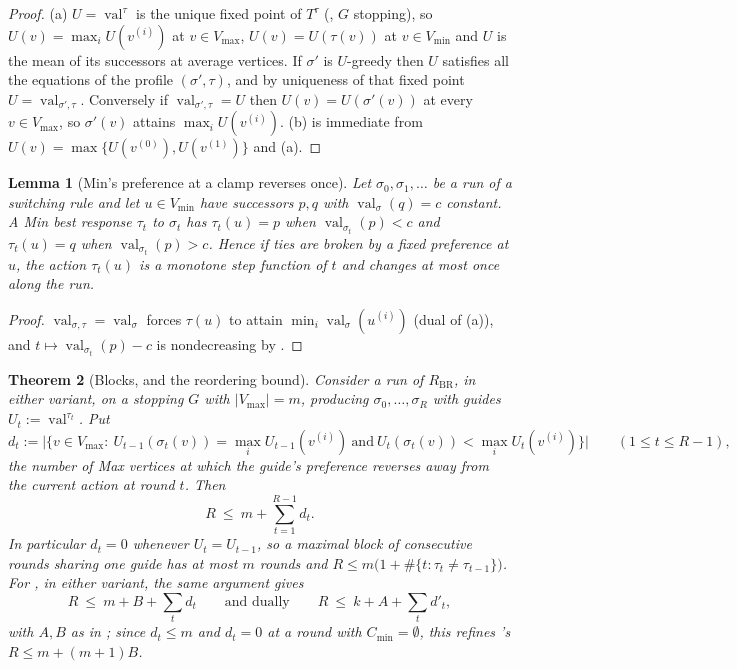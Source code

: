 \documentclass[11pt]{article}
\theoremstyle{plain}
\newtheorem{theorem}{Theorem}[section]
\newtheorem{lemma}[theorem]{Lemma}
\theoremstyle{definition}
\DeclareMathOperator{\val}{val}
\newcommand{\Vmax}{V_{\max}}
\newcommand{\Vmin}{V_{\min}}
\begin{document}
\begin{proof}
(a) $U=\val^{\tau}$ is the unique fixed point of $T^{\tau}$
(, $G$ stopping), so $U(v)=\max_iU(v^{(i)})$ at
$v\in\Vmax$, $U(v)=U(\tau(v))$ at $v\in\Vmin$ and $U$ is the mean of its
successors at average vertices.  If $\sigma'$ is $U$-greedy then $U$ satisfies
all the equations of the profile $(\sigma',\tau)$, and by uniqueness of that
fixed point $U=\val_{\sigma',\tau}$.  Conversely if $\val_{\sigma',\tau}=U$
then $U(v)=U(\sigma'(v))$ at every $v\in\Vmax$, so $\sigma'(v)$ attains
$\max_iU(v^{(i)})$.  (b) is immediate from
$U(v)=\max\{U(v^{(0)}),U(v^{(1)})\}$ and (a).
\end{proof}





\begin{lemma}[Min's preference at a clamp reverses once]\label{lem:clamp-reverses-once}
Let $\sigma_0,\sigma_1,\dots$ be a run of a switching rule and let
$u\in\Vmin$ have successors $p,q$ with $\val_\sigma(q)=c$ constant.  A Min
best response $\tau_t$ to $\sigma_t$ has $\tau_t(u)=p$ when
$\val_{\sigma_t}(p)<c$ and $\tau_t(u)=q$ when $\val_{\sigma_t}(p)>c$.  Hence
if ties are broken by a fixed preference at $u$, the action $\tau_t(u)$ is a
monotone step function of $t$ and changes at most once along the run.
\end{lemma}

\begin{proof}
$\val_{\sigma,\tau}=\val_\sigma$ forces $\tau(u)$ to attain
$\min_i\val_\sigma(u^{(i)})$ (dual of (a)), and
$t\mapsto\val_{\sigma_t}(p)-c$ is nondecreasing by .
\end{proof}

\begin{theorem}[Blocks, and the reordering bound]\label{thm:reorder}
Consider a run of $R_{\mathrm{BR}}$, in either variant, on a stopping $G$ with
$|\Vmax|=m$, producing $\sigma_0,\dots,\sigma_R$ with guides
$U_t:=\val^{\tau_t}$.  Put
\[
  d_t:=\bigl|\{v\in\Vmax:\ U_{t-1}(\sigma_t(v))=\textstyle\max_iU_{t-1}(v^{(i)})
   \ \text{and}\ U_t(\sigma_t(v))<\max_iU_t(v^{(i)})\}\bigr|\qquad(1\le t\le R-1),
\]
the number of Max vertices at which the guide's preference \emph{reverses away
from the current action} at round $t$.  Then
\[
  R\ \le\ m+\sum_{t=1}^{R-1}d_t .
\]
In particular $d_t=0$ whenever $U_t=U_{t-1}$, so a maximal block of
consecutive rounds sharing one guide has at most $m$ rounds and
$R\le m\bigl(1+\#\{t:\tau_t\ne\tau_{t-1}\}\bigr)$.  For , in
either variant, the same argument gives
\[
  R\ \le\ m+B+\sum_{t}d_t\qquad\text{and dually}\qquad R\ \le\ k+A+\sum_{t}d'_t,
\]
with $A,B$ as in ; since $d_t\le m$ and $d_t=0$ at a
round with $C_{\min}=\emptyset$, this refines 's
$R\le m+(m+1)B$.
\end{theorem}
\end{document}
